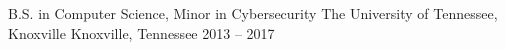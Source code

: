 

\begin{cventries}

  \cventry
    {B.S. in Computer Science, Minor in Cybersecurity} %
    {The University of Tennessee, Knoxville} %
    {Knoxville, Tennessee} %
    {2013 -- 2017} %
    {}

\end{cventries}
